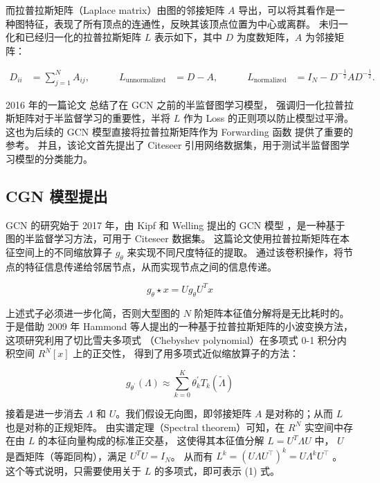 \documentclass[12pt]{ctexart} %
\begin{document}
而拉普拉斯矩阵（Laplace matrix）由图的邻接矩阵 $A$ 导出，可以将其看作是一种图特征，表现了所有顶点的连通性，反映其该顶点位置为中心或离群。
未归一化和已经归一化的拉普拉斯矩阵 $L$ 表示如下，其中 $D$ 为度数矩阵，$A$ 为邻接矩阵：

\[
\begin{aligned}
    D_{ii} &= \sum_{j=1}^{N} A_{ij}, \quad \quad \quad
    L_{\text{unnormalized}} &= D - A , \quad \quad \quad
    L_{\text{normalized}} &= I_N - D^{-\frac{1}{2}} A D^{-\frac{1}{2}} .
\end{aligned}
\]

2016 年的一篇论文\cite{yang_revisiting_2016} 总结了在 GCN 之前的半监督图学习模型，
强调归一化拉普拉斯矩阵对于半监督学习的重要性，半将 $L$ 作为 Loss 的正则项以防止模型过平滑。
这也为后续的 GCN 模型直接将拉普拉斯矩阵作为 Forwarding 函数 提供了重要的参考。
并且，该论文首先提出了 Citeseer 引用网络数据集，用于测试半监督图学习模型的分类能力。


\subsection{ CGN 模型提出}


GCN 的研究始于 2017 年，由 Kipf 和 Welling 提出的 GCN 模型 \cite{kipf2017semi}，是一种基于图的半监督学习方法，可用于 Citeseer 数据集。
这篇论文使用拉普拉斯矩阵在本征空间上的不同缩放算子 $g_{\theta}$ 来实现不同尺度特征的提取。
通过该卷积操作，将节点的特征信息传递给邻居节点，从而实现节点之间的信息传递。

\[
g_{\theta}\star x=U g_{\theta}U^{T}x
\]


上述式子必须进一步化简，否则大型图的 $N$ 阶矩阵本征值分解将是无比耗时的。于是借助 2009 年 Hammond 等人提出的一种基于拉普拉斯矩阵的小波变换方法\cite{hammond_wavelets_2009}，
这项研究利用了切比雪夫多项式 （Chebyshev polynomial）在多项式 0-1 积分内积空间 $R^N[x]$ 上的正交性，
得到了用多项式近似缩放算子的方法：

\[
    g_{\theta^{\prime}}(\Lambda)\approx\sum_{k=0}^{K}\theta_{k}^{\prime}T_{k}(\tilde{\Lambda})
    \tag{1}
\]


接着是进一步消去 $\Lambda$ 和 $U$。我们假设无向图，即邻接矩阵 $A$ 是对称的；从而 $L$ 也是对称的正规矩阵。
由实谱定理（Spectral theorem）可知，在 $R^N$ 实空间中存在由 $L$ 的本征向量构成的标准正交基，
这使得其本征值分解 $L=U^T \Lambda U $ 中， $U$ 是酉矩阵（等距同构），满足 $ U^T U = I_N $。
从而有 $L^k = (U\Lambda U^{\top})^{k}=U\Lambda^{k}U^{\top}$ 。 这个等式说明，只需要使用关于 $L$ 的多项式，即可表示 (1) 式。
\end{document}
